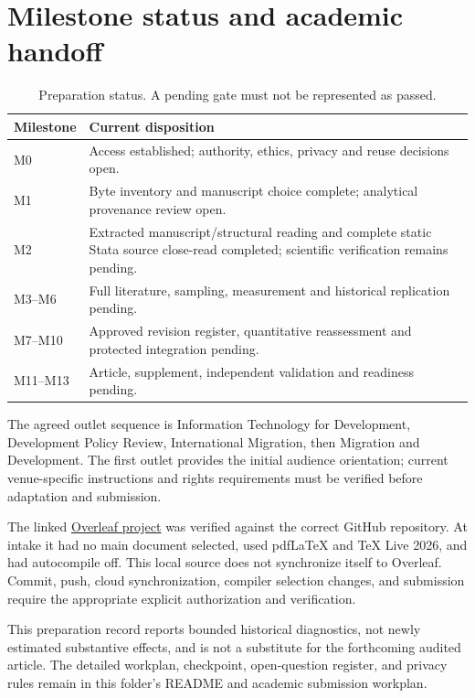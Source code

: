 \documentclass[11pt,a4paper]{article}
\begin{document}
\section{Milestone status and academic handoff}
\begin{table}[htbp]
\centering
\small
\begin{tabularx}{\textwidth}{@{}lX@{}}
\toprule
Milestone & Current disposition \\
\midrule
M0 & Access established; authority, ethics, privacy and reuse decisions open. \\
M1 & Byte inventory and manuscript choice complete; analytical provenance review open. \\
M2 & Extracted manuscript/structural reading and complete static Stata source close-read completed; scientific verification remains pending. \\
M3--M6 & Full literature, sampling, measurement and historical replication pending. \\
M7--M10 & Approved revision register, quantitative reassessment and protected integration pending. \\
M11--M13 & Article, supplement, independent validation and readiness pending. \\
\bottomrule
\end{tabularx}
\caption{Preparation status. A pending gate must not be represented as passed.}
\end{table}

The agreed outlet sequence is Information Technology for Development,
Development Policy Review, International Migration, then Migration and
Development. The first outlet provides the initial audience orientation;
current venue-specific instructions and rights requirements must be verified
before adaptation and submission.

The linked
\href{https://www.overleaf.com/project/6ac365fc911d6a7c7f8003e3}{Overleaf project}
was verified against the correct GitHub repository. At intake it had no main
document selected, used pdfLaTeX and TeX Live 2026, and had autocompile off.
This local source does not synchronize itself to Overleaf. Commit, push,
cloud synchronization, compiler selection changes, and submission require the
appropriate explicit authorization and verification.

This preparation record reports bounded historical diagnostics, not newly
estimated substantive effects, and is not a substitute for the forthcoming audited article. The
detailed workplan, checkpoint, open-question register, and privacy rules remain
in this folder's README and academic submission workplan.
\end{document}
